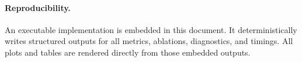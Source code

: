 \paragraph{Reproducibility.}
An executable implementation is embedded in this document. It deterministically writes structured outputs for all metrics, ablations, diagnostics, and timings. All plots and tables are rendered directly from those embedded outputs.



